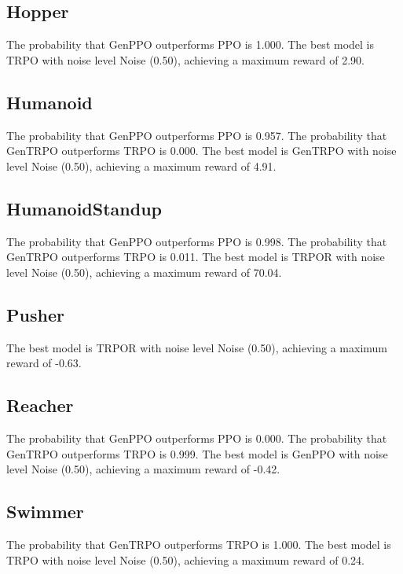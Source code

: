 \subsection{Hopper}
The probability that GenPPO outperforms PPO is 1.000.
The best model is TRPO with noise level Noise (0.50), achieving a maximum reward of 2.90.
\subsection{Humanoid}
The probability that GenPPO outperforms PPO is 0.957.
The probability that GenTRPO outperforms TRPO is 0.000.
The best model is GenTRPO with noise level Noise (0.50), achieving a maximum reward of 4.91.
\subsection{HumanoidStandup}
The probability that GenPPO outperforms PPO is 0.998.
The probability that GenTRPO outperforms TRPO is 0.011.
The best model is TRPOR with noise level Noise (0.50), achieving a maximum reward of 70.04.
\subsection{Pusher}
The best model is TRPOR with noise level Noise (0.50), achieving a maximum reward of -0.63.
\subsection{Reacher}
The probability that GenPPO outperforms PPO is 0.000.
The probability that GenTRPO outperforms TRPO is 0.999.
The best model is GenPPO with noise level Noise (0.50), achieving a maximum reward of -0.42.
\subsection{Swimmer}
The probability that GenTRPO outperforms TRPO is 1.000.
The best model is TRPO with noise level Noise (0.50), achieving a maximum reward of 0.24.